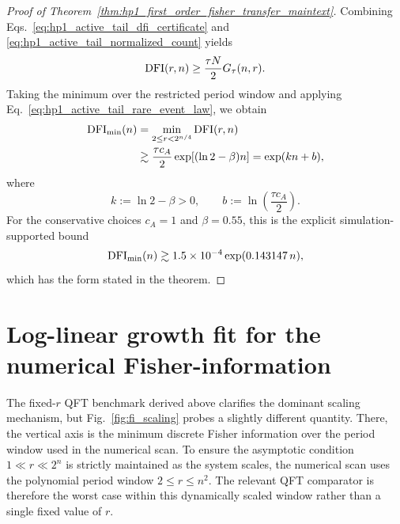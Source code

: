 \begin{proof}[Proof of Theorem~\ref{thm:hp1_first_order_fisher_transfer_maintext}]
Combining Eqs.~\eqref{eq:hp1_active_tail_dfi_certificate} and
\eqref{eq:hp1_active_tail_normalized_count} yields
\begin{equation}
    \mathrm{DFI}(r,n)
    \ge
    \frac{\tau N}{2}G_\tau(n,r).
    \label{eq:hp1_active_tail_dfi_normalized}
\end{equation}
Taking the minimum over the restricted period window and applying
Eq.~\eqref{eq:hp1_active_tail_rare_event_law}, we obtain
\begin{align}
    \mathrm{DFI}_{\min}(n)
    &=
    \min_{2\le r<2^{n/4}}\mathrm{DFI}(r,n) \nonumber\\
    &\gtrsim
    \frac{\tau c_A}{2}
    \exp\!\left[(\ln 2-\beta)n\right]
    =
    \exp(kn+b),
    \label{eq:hp1_restricted_window_ln_linear_bound}
\end{align}
where
\begin{equation}
    k:=\ln 2-\beta>0,
    \qquad
    b:=\ln\!\left(\frac{\tau c_A}{2}\right).
    \label{eq:hp1_active_tail_k_b}
\end{equation}
For the conservative choices \(c_A=1\) and \(\beta=0.55\), this is the
explicit simulation-supported bound
\begin{equation}
    \mathrm{DFI}_{\min}(n)
    \gtrsim
    1.5\times10^{-4}\exp(0.143147\,n),
    \label{eq:hp1_active_tail_explicit_bound}
\end{equation}
which has the form stated in the theorem.
\end{proof}



\section{Log-linear growth fit for the numerical Fisher-information}
\label{app:fi_log_linear_growth}
The fixed-$r$ QFT benchmark derived above clarifies the dominant scaling mechanism, but Fig.~\ref{fig:fi_scaling} probes a slightly different quantity. There, the vertical axis is the minimum discrete Fisher information over the period window used in the numerical scan. To ensure the asymptotic condition $1 \ll r \ll 2^n$ is strictly maintained as the system scales, the numerical scan uses the polynomial period window $2 \leq r \leq n^2$. The relevant QFT comparator is therefore the worst case within this dynamically scaled window rather than a single fixed value of $r$.

